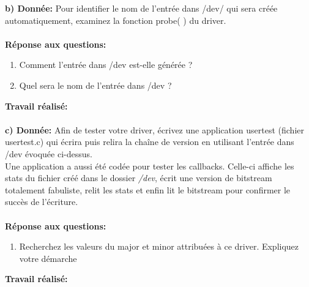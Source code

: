 \textbf{b) Donnée: }Pour identifier le nom de l'entrée dans /dev/ qui sera créée automatiquement, examinez la fonction
probe( ) du driver.\\\\
\textbf{Réponse aux questions: }
\begin{enumerate}
	\item Comment l'entrée dans /dev est-elle générée ? 
	\item  Quel sera le nom de l'entrée dans /dev ? \\
\end{enumerate}
\textbf{Travail réalisé: }\\\\
\textbf{c) Donnée: }Afin de tester votre driver, écrivez une application usertest (fichier usertest.c) qui écrira puis relira
la chaîne de version en utilisant l’entrée dans /dev évoquée ci-dessus.\\
Une application a aussi été codée pour tester les callbacks. Celle-ci affiche les stats du fichier créé dans le dossier \textit{/dev}, écrit une version de bitstream totalement fabuliste, relit les stats et enfin lit le bitstream pour confirmer le succès de l'écriture.\\\\
\textbf{Réponse aux questions: }
\begin{enumerate}
	\item Recherchez les valeurs du major et minor attribuées à ce driver. Expliquez votre démarche\\
\end{enumerate}
\textbf{Travail réalisé: }\\\\
